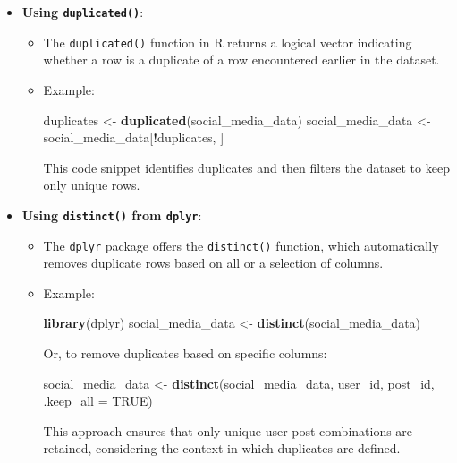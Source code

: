 \documentclass[
]{book}
\newenvironment{Shaded}{\begin{snugshade}}{\end{snugshade}}
\newcommand{\AttributeTok}[1]{\textcolor[rgb]{0.13,0.29,0.53}{#1}}
\newcommand{\ConstantTok}[1]{\textcolor[rgb]{0.56,0.35,0.01}{#1}}
\newcommand{\FunctionTok}[1]{\textcolor[rgb]{0.13,0.29,0.53}{\textbf{#1}}}
\newcommand{\NormalTok}[1]{#1}
\newcommand{\OtherTok}[1]{\textcolor[rgb]{0.56,0.35,0.01}{#1}}
\newcommand{\SpecialCharTok}[1]{\textcolor[rgb]{0.81,0.36,0.00}{\textbf{#1}}}
\providecommand{\tightlist}{%
  \setlength{\itemsep}{0pt}\setlength{\parskip}{0pt}}
\begin{document}
\begin{itemize}
\tightlist
\item
  \textbf{Using \texttt{duplicated()}}:

  \begin{itemize}
  \item
    The \texttt{duplicated()} function in R returns a logical vector indicating whether a row is a duplicate of a row encountered earlier in the dataset.
  \item
    Example:

\begin{Shaded}
\begin{Highlighting}[]
\NormalTok{duplicates }\OtherTok{\textless{}{-}} \FunctionTok{duplicated}\NormalTok{(social\_media\_data)}
\NormalTok{social\_media\_data }\OtherTok{\textless{}{-}}\NormalTok{ social\_media\_data[}\SpecialCharTok{!}\NormalTok{duplicates, ]}
\end{Highlighting}
\end{Shaded}

    This code snippet identifies duplicates and then filters the dataset to keep only unique rows.
  \end{itemize}
\item
  \textbf{Using \texttt{distinct()} from \texttt{dplyr}}:

  \begin{itemize}
  \item
    The \texttt{dplyr} package offers the \texttt{distinct()} function, which automatically removes duplicate rows based on all or a selection of columns.
  \item
    Example:

\begin{Shaded}
\begin{Highlighting}[]
\FunctionTok{library}\NormalTok{(dplyr)}
\NormalTok{social\_media\_data }\OtherTok{\textless{}{-}} \FunctionTok{distinct}\NormalTok{(social\_media\_data)}
\end{Highlighting}
\end{Shaded}

    Or, to remove duplicates based on specific columns:

\begin{Shaded}
\begin{Highlighting}[]
\NormalTok{social\_media\_data }\OtherTok{\textless{}{-}} \FunctionTok{distinct}\NormalTok{(social\_media\_data, user\_id, post\_id, }\AttributeTok{.keep\_all =} \ConstantTok{TRUE}\NormalTok{)}
\end{Highlighting}
\end{Shaded}

    This approach ensures that only unique user-post combinations are retained, considering the context in which duplicates are defined.
  \end{itemize}
\end{itemize}
\end{document}
